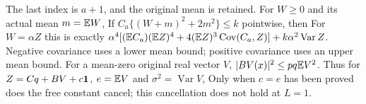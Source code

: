 The last index is $a+1$, and the original mean is retained.
For $W\ge\allowbreak 0$ and its actual mean $m=\allowbreak \mathbb E W$,
If $C_a\{(W+m)^2+2m^2\}\le\allowbreak  k$ pointwise, then
For $W=\allowbreak \alpha Z$ this is exactly
$\alpha^4[(\mathbb E C_a)(\mathbb E Z)^4+4(\mathbb E Z)^3\operatorname{Cov}(C_a,Z)]
+k\alpha^2\operatorname{Var}Z$.
Negative covariance uses a lower mean bound; positive covariance uses an
upper mean bound.
For a mean-zero original real vector $V$,
$|BV(x)|^2\le\allowbreak  pq\mathbb E V^2$. Thus for $Z=\allowbreak Cq+BV+c\mathbf1$,
$e=\allowbreak \mathbb E V$ and $\sigma^2=\allowbreak \operatorname{Var}V$,
Only when $c=\allowbreak e$ has been proved does the free constant cancel;
this cancellation does not hold at $L=\allowbreak 1$.

